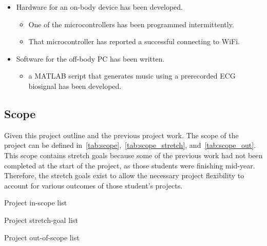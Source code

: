 \begin{itemize}
        \item Hardware for an on-body device has been developed.
        \begin{itemize}
                \item One of the microcontrollers has been programmed intermittently.
                \item That microcontroller has reported a successful connecting to WiFi.
        \end{itemize}
        \item Software for the off-body PC has been written.
        \begin{itemize}
                \item a MATLAB script that generates music using a prerecorded ECG biosignal has been developed.
        \end{itemize}
\end{itemize}

\subsection{Scope}
Given this project outline and the previous project work.
The scope of the project can be defined in~\autoref{tab:scope},~\autoref{tab:scope_stretch}, and~\autoref{tab:scope_out}.
This scope contains stretch goals because some of the previous work had not been completed at the start of the project,
as those students were finishing mid-year.
Therefore, the stretch goals exist to allow the necessary project flexibility to account for various outcomes of those student's projects.

\begin{table}[!ht]
    \caption{Project in-scope list}\label{tab:scope}
    \centering
    
\end{table}

\begin{table}[!ht]
    \caption{Project stretch-goal list}\label{tab:scope_stretch}
    \centering
    
\end{table}

\begin{table}[!ht]
    \caption{Project out-of-scope list}\label{tab:scope_out}
    \centering
    
\end{table}
